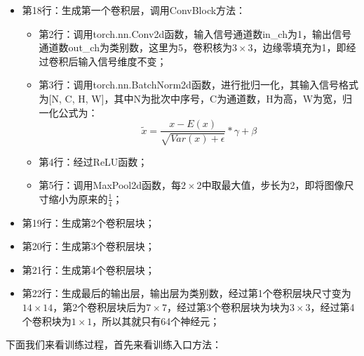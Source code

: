 \begin{itemize}
\item 第18行：生成第一个卷积层，调用ConvBlock方法：
	\begin{itemize}
	\item 第2行：调用torch.nn.Conv2d函数，输入信号通道数in\_ch为1，输出信号通道数out\_ch为类别数，这里为5，卷积核为$3 \times 3$，边缘零填充为1，即经过卷积后输入信号维度不变；
	\item 第3行：调用torch.nn.BatchNorm2d函数，进行批归一化，其输入信号格式为[N, C, H, W]，其中N为批次中序号，C为通道数，H为高，W为宽，归一化公式为：
\begin{equation}
\tilde{x} = \frac{x-E(x)}{ \sqrt{ Var(x) + \epsilon } } * \gamma + \beta
\label{e0301-batch-norm-2d-formula}
\end{equation}
	\item 第4行：经过ReLU函数；
	\item 第5行：调用MaxPool2d函数，每$2 \times 2$中取最大值，步长为2，即将图像尺寸缩小为原来的$\frac{1}{4}$；
	\end{itemize}
\item 第19行：生成第2个卷积层块；
\item 第20行：生成第3个卷积层块；
\item 第21行：生成第4个卷积层块；
\item 第22行：生成最后的输出层，输出层为类别数，经过第1个卷积层块尺寸变为$14 \times 14$，第2个卷积层块后为$7 \times 7$，经过第3个卷积层块为块为$3 \times 3$，经过第4个卷积块为$1 \times 1$，所以其就只有64个神经元；
\end{itemize}
下面我们来看训练过程，首先来看训练入口方法：
